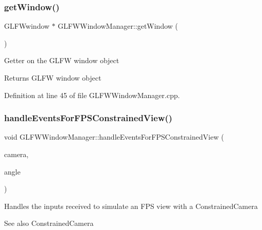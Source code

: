 \mbox{\label{class_g_l_f_w_window_manager_a5e1013598a0231e8d007302bde7530f1}} 
\subsubsection{\texorpdfstring{get\+Window()}{getWindow()}}
{\footnotesize\ttfamily G\+L\+F\+Wwindow $\ast$ G\+L\+F\+W\+Window\+Manager\+::get\+Window (\begin{DoxyParamCaption}{ }\end{DoxyParamCaption})}

Getter on the G\+L\+FW window object \begin{DoxyReturn}{Returns}
G\+L\+FW window object 
\end{DoxyReturn}


Definition at line 45 of file G\+L\+F\+W\+Window\+Manager.\+cpp.

\mbox{\label{class_g_l_f_w_window_manager_ac42e3f0fbc9f348b37b50a3cbb3a0205}} 
\subsubsection{\texorpdfstring{handle\+Events\+For\+F\+P\+S\+Constrained\+View()}{handleEventsForFPSConstrainedView()}}
{\footnotesize\ttfamily void G\+L\+F\+W\+Window\+Manager\+::handle\+Events\+For\+F\+P\+S\+Constrained\+View (\begin{DoxyParamCaption}\item[{\hyperlink{classglimac_1_1_constrained_camera}{glimac\+::\+Constrained\+Camera} \&}]{camera,  }\item[{float}]{angle }\end{DoxyParamCaption})}

Handles the inputs received to simulate an F\+PS view with a Constrained\+Camera \begin{DoxySeeAlso}{See also}
Constrained\+Camera 
\end{DoxySeeAlso}

